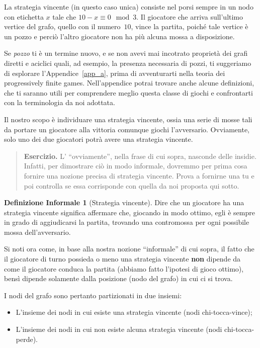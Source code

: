 \documentclass[a4paper, 10pt]{report}
\newenvironment{esercizio}{\begin{quote}\textbf{Esercizio.} }{\end{quote}}
\theoremstyle{definition} %
\newtheorem*{definizioneInformale}{Definizione Informale}
\begin{document}
La strategia vincente (in questo caso unica) consiste nel porsi sempre in un nodo
con etichetta $x$ tale che $10-x \equiv 0 \mod 3$.
Il giocatore che arriva sull'ultimo vertice del grafo, quello con il numero~$10$,
vince la partita, poich\'e tale vertice \`e un pozzo e perci\`o l'altro
giocatore non ha pi\`u alcuna mossa a disposizione.

Se \emph{pozzo} ti \`e un termine nuovo, e se non avevi mai incotrato
propriet\`a dei grafi diretti e aciclici quali, ad esempio, la presenza
necessaria di pozzi, ti suggeriamo di esplorare l'Appendice~\ref{app_a}, prima
di avventurarti nella teoria dei progressively finite games. Nell'appendice
potrai trovare anche alcune definizioni, che ti saranno utili per comprendere
meglio questa classe di giochi e confrontarti con la terminologia da noi
adottata.
\newline

Il nostro scopo \`e individuare una strategia vincente, ossia una serie di
mosse tali da portare un giocatore alla vittoria comunque giochi
l'avversario. Ovviamente, solo uno dei due giocatori potr\`a avere una
strategia vincente.
\newline

\begin{esercizio}
L' ``ovviamente'', nella frase di cui sopra, nasconde delle insidie. Infatti,
per dimostrare ciò in modo informale, dovremmo per prima cosa fornire una
nozione precisa di strategia vincente. Prova a fornirne una tu e poi controlla
se essa corrisponde con quella da noi proposta qui sotto.
\end{esercizio}

\begin{definizioneInformale}[Strategia vincente]
Dire che un giocatore ha una strategia vincente significa affermare che,
giocando in modo ottimo, egli \`e sempre in grado di aggiudicarsi la partita,
trovando una contromossa per ogni possibile mossa dell'avversario.
\end{definizioneInformale}

Si noti ora come, in base alla nostra nozione ``informale'' di cui sopra, il
fatto che il giocatore di turno possieda o meno una strategia vincente
\textbf{non} dipende da come il giocatore conduca la partita (abbiamo fatto
l'ipotesi di gioco ottimo), bens\`i dipende solamente dalla posizione (nodo
del grafo) in cui ci si trova.

I nodi del grafo sono pertanto partizionati in due insiemi:
\begin{itemize}
\item L'insieme dei nodi in cui esiste una strategia vincente (nodi
  chi-tocca-vince);
\item L'insieme dei nodi in cui non esiste alcuna strategia vincente (nodi
  chi-tocca-perde).
\end{itemize}
\end{document}
